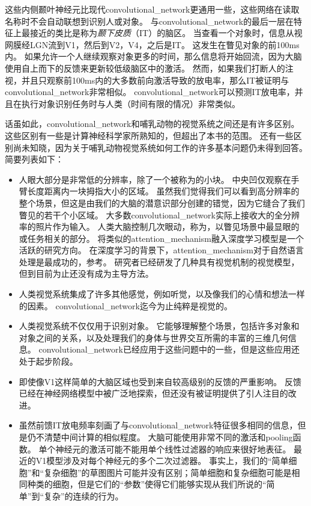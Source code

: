  
这些内侧颞叶神经元比现代\gls{convolutional_network}更通用一些，这些网络在读取名称时不会自动联想到识别人或对象。
与\gls{convolutional_network}的最后一层在特征上最接近的类比是称为\emph{颞下皮质}（IT）的脑区。
当查看一个对象时，信息从视网膜经LGN流到V1，然后到V2，V4，之后是IT。
这发生在瞥见对象的前100ms内。
如果允许一个人继续观察对象更多的时间，那么信息将开始回流，因为大脑使用自上而下的反馈来更新较低级脑区中的激活。
然而，如果我们打断人的注视，并且只观察前100ms内的大多数前向激活导致的放电率，那么IT被证明与\gls{convolutional_network}非常相似。
\gls{convolutional_network}可以预测IT放电率，并且在执行对象识别任务时与人类（时间有限的情况）非常类似\citep{dicarlo-tutorial-2013}。

话虽如此，\gls{convolutional_network}和哺乳动物的视觉系统之间还是有许多区别。
这些区别有一些是计算神经科学家所熟知的，但超出了本书的范围。
还有一些区别尚未知晓，因为关于哺乳动物视觉系统如何工作的许多基本问题仍未得到回答。
简要列表如下：
\begin{itemize}
  \item 人眼大部分是非常低的分辨率，除了一个被称为的小块。
  中央凹仅观察在手臂长度距离内一块拇指大小的区域。
  虽然我们觉得我们可以看到高分辨率的整个场景，但这是由我们的大脑的潜意识部分创建的错觉，因为它缝合了我们瞥见的若干个小区域。
  大多数\gls{convolutional_network}实际上接收大的全分辨率的照片作为输入。
  人类大脑控制几次眼动，称为，以瞥见场景中最显眼的或任务相关的部分。
  将类似的\gls{attention_mechanism}融入深度学习模型是一个活跃的研究方向。
  在深度学习的背景下，\gls{attention_mechanism}对于自然语言处理是最成功的，参考。
  研究者已经研发了几种具有视觉机制的视觉模型，但到目前为止还没有成为主导方法\citep{Larochelle2010,Denil2012}。
  
  \item 人类视觉系统集成了许多其他感觉，例如听觉，以及像我们的心情和想法一样的因素。
  \gls{convolutional_network}迄今为止纯粹是视觉的。
  
  \item 人类视觉系统不仅仅用于识别对象。
  它能够理解整个场景，包括许多对象和对象之间的关系，以及处理我们的身体与世界交互所需的丰富的三维几何信息。
  \gls{convolutional_network}已经应用于这些问题中的一些，但是这些应用还处于起步阶段。
  
  \item 即使像V1这样简单的大脑区域也受到来自较高级别的反馈的严重影响。
  反馈已经在神经网络模型中被广泛地探索，但还没有被证明提供了引人注目的改进。
  
  \item 虽然前馈IT放电频率刻画了与\gls{convolutional_network}特征很多相同的信息，但是仍不清楚中间计算的相似程度。
  大脑可能使用非常不同的激活和\gls{pooling}函数。
  单个神经元的激活可能不能用单个线性过滤器的响应来很好地表征。
  最近的V1模型涉及对每个神经元的多个二次过滤器\citep{rust:2005}。
  事实上，我们的``简单细胞''和``复杂细胞''的草图图片可能并没有区别；简单细胞和复杂细胞可能是相同种类的细胞，但是它们的``参数''使得它们能够实现从我们所说的``简单''到``复杂''的连续的行为。
\end{itemize}
 
